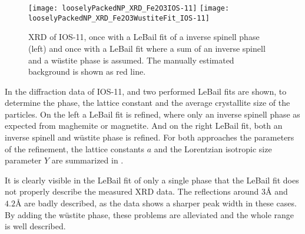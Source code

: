 \documentclass[\main/dresen_thesis.tex]{subfiles}
\begin{document}
  \label{sec:looselyPackedNS:nanoparticle:xrd}
  \begin{figure}[tb]
    \centering
    \texttt{[image: looselyPackedNP\_XRD\_Fe2O3IOS-11]}
    \texttt{[image: looselyPackedNP\_XRD\_Fe2O3WustiteFit\_IOS-11]}
    \caption{\label{fig:looselyPackedNP:nanoparticle:xrd}XRD of IOS-11, once with a LeBail fit of a inverse spinell phase (left) and once with a LeBail fit where a sum of an inverse spinell and a w\"ustite phase is assumed. The manually estimated background is shown as red line.}
  \end{figure}

  In  the diffraction data of IOS-11, and two performed LeBail fits are shown, to determine the phase, the lattice constant and the average crystallite size of the particles.
  On the left a LeBail fit is refined, where only an inverse spinell phase as expected from maghemite or magnetite.
  And on the right LeBail fit, both an inverse spinell and w\"ustite phase is refined.
  For both approaches the parameters of the refinement, the lattice constants $a$ and the Lorentzian isotropic size parameter $Y$ are summarized in .

  It is clearly visible in the LeBail fit of only a single phase that the LeBail fit does not properly describe the measured XRD data.
  The reflections around $3 \unit{\angstrom}$ and $4.2 \unit{\angstrom}$ are badly described, as the data shows a sharper peak width in these cases.
  By adding the w\"ustite phase, these problems are alleviated and the whole range is well described.
\end{document}
